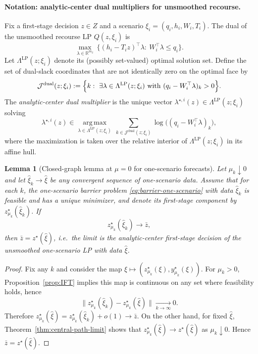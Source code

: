 \documentclass[11pt]{article}
\theoremstyle{plain}
\newtheorem{lemma}[theorem]{Lemma}
\theoremstyle{definition}
\theoremstyle{remark}
\newcommand{\argmax}{\operatorname*{arg\,max}}
\begin{document}
\paragraph{Notation: analytic-center dual multipliers for unsmoothed recourse.}
Fix a first-stage decision $z\in Z$ and a scenario $\xi_i=(q_i,h_i,W_i,T_i)$.
The dual of the unsmoothed recourse LP $Q(z,\xi_i)$ is
\[
\max_{\lambda\in\mathbb{R}^{m_2}}\ \{(h_i-T_i z)^\top\lambda:\ W_i^\top\lambda\le q_i\}.
\]
Let $\Lambda^{\mathrm{LP}}(z;\xi_i)$ denote its (possibly set-valued) optimal solution set.
Define the set of dual-slack coordinates that are not identically zero on the optimal face by
\[
\mathcal J^{\mathrm{dual}}(z;\xi_i)
:=\Bigl\{k:\ \exists \lambda\in\Lambda^{\mathrm{LP}}(z;\xi_i)\ \text{with}\ (q_i-W_i^\top\lambda)_k>0\Bigr\}.
\]
The \emph{analytic-center dual multiplier} is the unique vector $\lambda^{\star,i}(z)\in\Lambda^{\mathrm{LP}}(z;\xi_i)$ solving
\[
\lambda^{\star,i}(z)\in
\argmax_{\lambda\in\Lambda^{\mathrm{LP}}(z;\xi_i)}
\ \sum_{k\in\mathcal J^{\mathrm{dual}}(z;\xi_i)}\log\bigl((q_i-W_i^\top\lambda)_k\bigr),
\]
where the maximization is taken over the relative interior of $\Lambda^{\mathrm{LP}}(z;\xi_i)$ in its affine hull.

\begin{lemma}[Closed-graph lemma at $\mu=0$ for one-scenario forecasts]\label{lem:closed-graph}
Let $\mu_k\downarrow 0$ and let $\hat\xi_k\to\hat\xi$ be any convergent sequence of one-scenario data.
Assume that for each $k$, the one-scenario barrier problem \eqref{eq:barrier-one-scenario} with data $\hat\xi_k$
is feasible and has a unique minimizer, and denote its first-stage component by $z_{\mu_k}^\star(\hat\xi_k)$.
If
\[
z_{\mu_k}^\star(\hat\xi_k)\to \bar z,
\]
then $\bar z = z^\star(\hat\xi)$, i.e.\ the limit is the analytic-center first-stage decision of the
\emph{unsmoothed} one-scenario LP with data $\hat\xi$.
\end{lemma}

\begin{proof}
Fix any $k$ and consider the map $\xi\mapsto (z_{\mu_k}^\star(\xi),y_{\mu_k}^\star(\xi))$.
For $\mu_k>0$, Proposition~\ref{prop:IFT} implies this map is continuous on any set where feasibility holds, hence
\[
\bigl\|z_{\mu_k}^\star(\hat\xi_k)-z_{\mu_k}^\star(\hat\xi)\bigr\|\xrightarrow[k\to\infty]{}0.
\]
Therefore $z_{\mu_k}^\star(\hat\xi)=z_{\mu_k}^\star(\hat\xi_k)+o(1)\to\bar z$.
On the other hand, for fixed $\hat\xi$, Theorem~\ref{thm:central-path-limit} shows that
$z_{\mu_k}^\star(\hat\xi)\to z^\star(\hat\xi)$ as $\mu_k\downarrow 0$.
Hence $\bar z=z^\star(\hat\xi)$.
\end{proof}
\end{document}
